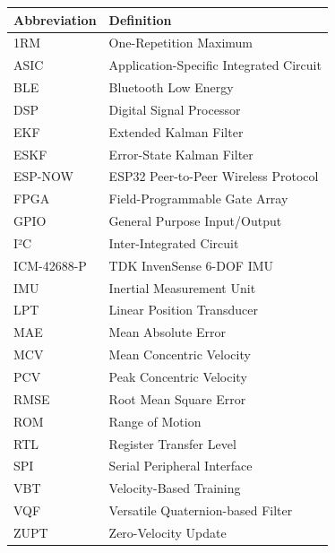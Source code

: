 \documentclass[12pt,a4paper,oneside]{book}
\begin{document}
\begin{tabular}{@{}ll@{}}
    \toprule
    \textbf{Abbreviation} & \textbf{Definition} \\
    \midrule
    1RM & One-Repetition Maximum \\
    ASIC & Application-Specific Integrated Circuit \\
    BLE & Bluetooth Low Energy \\
    DSP & Digital Signal Processor \\
    EKF & Extended Kalman Filter \\
    ESKF & Error-State Kalman Filter \\
    ESP-NOW & ESP32 Peer-to-Peer Wireless Protocol \\
    FPGA & Field-Programmable Gate Array \\
    GPIO & General Purpose Input/Output \\
    I²C & Inter-Integrated Circuit \\
    ICM-42688-P & TDK InvenSense 6-DOF IMU \\
    IMU & Inertial Measurement Unit \\
    LPT & Linear Position Transducer \\
    MAE & Mean Absolute Error \\
    MCV & Mean Concentric Velocity \\
    PCV & Peak Concentric Velocity \\
    RMSE & Root Mean Square Error \\
    ROM & Range of Motion \\
    RTL & Register Transfer Level \\
    SPI & Serial Peripheral Interface \\
    VBT & Velocity-Based Training \\
    VQF & Versatile Quaternion-based Filter \\
    ZUPT & Zero-Velocity Update \\
    \bottomrule
\end{tabular}

\newpage





















\appendix





\end{document}
